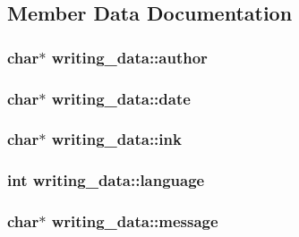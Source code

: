\subsection{Member Data Documentation}
\hypertarget{structwriting__data_a9129b7e95050122469d4f55b97f88aa5}{
\subsubsection[{author}]{\setlength{\rightskip}{0pt plus 5cm}char$\ast$ writing\-\_\-data\-::author}}\label{structwriting__data_a9129b7e95050122469d4f55b97f88aa5}
\hypertarget{structwriting__data_ac155d771cd707ded96c253da837111d1}{
\subsubsection[{date}]{\setlength{\rightskip}{0pt plus 5cm}char$\ast$ writing\-\_\-data\-::date}}\label{structwriting__data_ac155d771cd707ded96c253da837111d1}
\hypertarget{structwriting__data_ae6042cc8593e6b92b63704ba71a38adb}{
\subsubsection[{ink}]{\setlength{\rightskip}{0pt plus 5cm}char$\ast$ writing\-\_\-data\-::ink}}\label{structwriting__data_ae6042cc8593e6b92b63704ba71a38adb}
\hypertarget{structwriting__data_a6c24b92af8363e7e5519ab1fbcd860c3}{
\subsubsection[{language}]{\setlength{\rightskip}{0pt plus 5cm}int writing\-\_\-data\-::language}}\label{structwriting__data_a6c24b92af8363e7e5519ab1fbcd860c3}
\hypertarget{structwriting__data_a84940ea582ca31116e5e0f4745ed1c74}{
\subsubsection[{message}]{\setlength{\rightskip}{0pt plus 5cm}char$\ast$ writing\-\_\-data\-::message}}\label{structwriting__data_a84940ea582ca31116e5e0f4745ed1c74}
